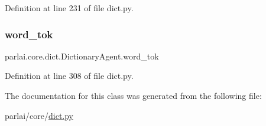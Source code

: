 Definition at line 231 of file dict.\+py.

\mbox{\label{classparlai_1_1core_1_1dict_1_1DictionaryAgent_a025ffc815b72c6d2d34c12249956d4f1}} 
\subsubsection{\texorpdfstring{word\+\_\+tok}{word\_tok}}
{\footnotesize\ttfamily parlai.\+core.\+dict.\+Dictionary\+Agent.\+word\+\_\+tok}



Definition at line 308 of file dict.\+py.



The documentation for this class was generated from the following file\+:\begin{DoxyCompactItemize}
\item 
parlai/core/\hyperlink{dict_8py}{dict.\+py}\end{DoxyCompactItemize}
